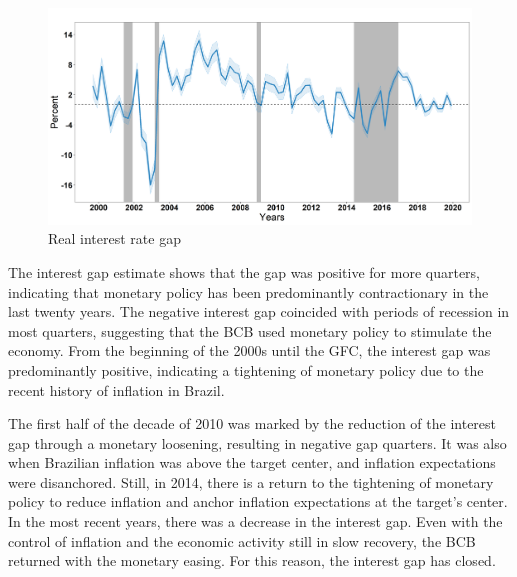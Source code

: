 \documentclass[12pt,oneside,a4paper]{article}
\begin{document}
\begin{figure}[H]
\begin{center}
\caption{Real interest rate gap}
\label{fig:Interest_gap}
\includegraphics[scale=0.50]{Capitulo_1/GAP_Juros.png}    
\end{center}
\end{figure}

The interest gap estimate shows that the gap was positive for more quarters, indicating that monetary policy has been predominantly contractionary in the last twenty years. The negative interest gap coincided with periods of recession in most quarters, suggesting that the BCB used monetary policy to stimulate the economy. From the beginning of the 2000s until the GFC, the interest gap was predominantly positive, indicating a tightening of monetary policy due to the recent history of inflation in Brazil.

The first half of the decade of 2010 was marked by the reduction of the interest gap through a monetary loosening, resulting in negative gap quarters. It was also when Brazilian inflation was above the target center, and inflation expectations were disanchored. Still, in 2014, there is a return to the tightening of monetary policy to reduce inflation and anchor inflation expectations at the target's center. In the most recent years, there was a decrease in the interest gap. Even with the control of inflation and the economic activity still in slow recovery, the BCB returned with the monetary easing. For this reason, the interest gap has closed. 
\\
\end{document}
